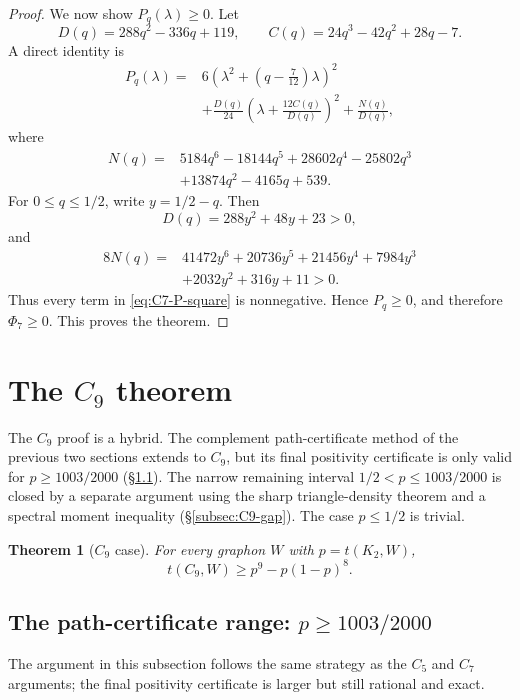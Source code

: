 \documentclass[11pt]{article}
\newtheorem{theorem}{Theorem}[section]
\begin{document}
\begin{proof}
We now show $P_q(\lambda)\ge0$.  Let
\[
        D(q)=288q^2-336q+119,
        \qquad
        C(q)=24q^3-42q^2+28q-7.
\]
A direct identity is
\begin{equation}\label{eq:C7-P-square}
\begin{aligned}
P_q(\lambda)={}&
6\left(\lambda^2+\left(q-\frac{7}{12}\right)\lambda\right)^2\\
&+\frac{D(q)}{24}
\left(\lambda+\frac{12C(q)}{D(q)}\right)^2
+\frac{N(q)}{D(q)},
\end{aligned}
\end{equation}
where
\[
\begin{aligned}
N(q)={}&5184q^6-18144q^5+28602q^4-25802q^3\\
&+13874q^2-4165q+539.
\end{aligned}
\]
For $0\le q\le1/2$, write $y=1/2-q$.  Then
\[
        D(q)=288y^2+48y+23>0,
\]
and
\[
\begin{aligned}
8N(q)={}&41472y^6+20736y^5+21456y^4+7984y^3\\
&+2032y^2+316y+11>0.
\end{aligned}
\]
Thus every term in \eqref{eq:C7-P-square} is nonnegative.  Hence $P_q\ge0$, and therefore $\Phi_7\ge0$.  This proves the theorem.
\end{proof}

\section{The $C_9$ theorem}\label{sec:C9}

The $C_9$ proof is a hybrid.  The complement path-certificate method of the previous two sections extends to $C_9$, but its final positivity certificate is only valid for $p\ge1003/2000$ (\S\ref{subsec:C9-path}).  The narrow remaining interval $1/2<p\le1003/2000$ is closed by a separate argument using the sharp triangle-density theorem and a spectral moment inequality (\S\ref{subsec:C9-gap}).  The case $p\le1/2$ is trivial.

\begin{theorem}[$C_9$ case]\label{thm:C9}
For every graphon $W$ with $p=t(K_2,W)$,
\[
        t(C_9,W)\ge p^9-p(1-p)^8.
\]
\end{theorem}

\subsection{The path-certificate range: $p\ge1003/2000$}\label{subsec:C9-path}

The argument in this subsection follows the same strategy as the $C_5$ and $C_7$ arguments; the final positivity certificate is larger but still rational and exact.
\end{document}
